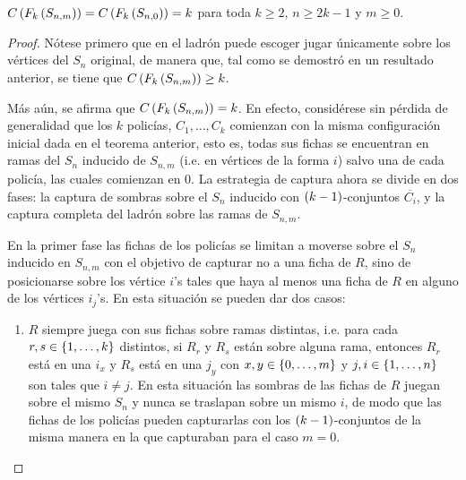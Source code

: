\begin{teorema}
\label{teo:numero-de-policia-estrella-subdivisiones}
    $C\left( F_k\left( S_{n,m}\right)\right)=C\left( F_k\left( S_{n,0}\right)\right)=k$ para toda $k\geq
    2$, $n\geq 2k-1$ y $m\geq 0$.
\end{teorema}
\begin{proof}
    N\'otese primero que en  el ladr\'on puede escoger jugar \'unicamente sobre
    los v\'ertices del $S_n$ original, de manera que, tal como se demostr\'o en
    un resultado anterior, se tiene que $C\left( F_k\left( S_{n,m}\right)\right)\geq k$.

    M\'as a\'un, se afirma que $C\left( F_k\left( S_{n,m}\right)\right)=k$. En efecto,
    consid\'erese sin p\'erdida de generalidad que los $k$ polic\'ias,
    $C_1,\dots, C_k$ comienzan con la misma configuraci\'on inicial dada en el
    teorema anterior, esto es, todas sus fichas se encuentran en ramas del $S_n$
    inducido de $S_{n,m}$ (i.e. en v\'ertices de la forma $i$) salvo una de cada
    polic\'ia, las cuales comienzan en $0$. La estrategia de captura ahora se
    divide en dos fases: la captura de sombras sobre el $S_n$ inducido con
    $\left( k-1\right)$-conjuntos $\overline{C_i}$, y la captura completa del ladr\'on
    sobre las ramas de $S_{n,m}$.

    En la primer fase las fichas de los polic\'ias se limitan a moverse sobre el
    $S_n$ inducido en $S_{n,m}$ con el objetivo de capturar no a una ficha de
    $R$, sino de posicionarse sobre los v\'ertice $i$'s tales que haya al menos
    una ficha de $R$ en alguno de los v\'ertices $i_j$'s. En esta situaci\'on se
    pueden dar dos casos:
        \begin{enumerate}
            \item $R$ siempre juega con sus fichas sobre ramas distintas, i.e.
            para cada $r,s\in \{1,\dots, k\}$ distintos, si $R_r$ y $R_s$ est\'an
            sobre alguna rama, entonces $R_r$ est\'a en una $i_{x}$ y $R_s$
            est\'a en una $j_{y}$ con $x,y\in \{0,\dots, m\}$ y $j,i\in \{1,\dots, n\}$
            son tales que $i\neq j$. En esta situaci\'on las sombras de las
            fichas de $R$ juegan sobre el mismo $S_n$ y nunca se traslapan sobre
            un mismo $i$, de modo que las fichas de los polic\'ias pueden
            capturarlas con los $\left( k-1\right)$-conjuntos de la misma manera en la
            que capturaban para el caso $m=0$.
            

\end{enumerate}
\end{proof}
